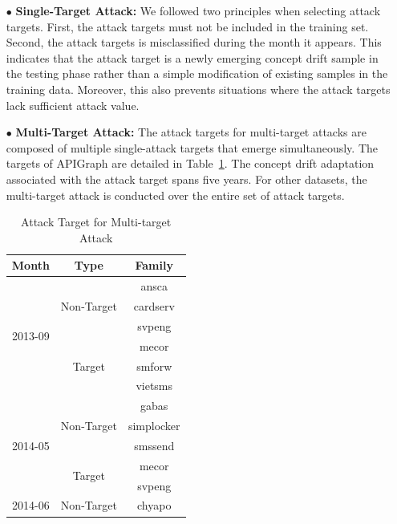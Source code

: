 \documentclass[lettersize,journal]{IEEEtran}
\begin{document}
\begin{itemize}[leftmargin=*]
	
	\item[$\bullet$] \textbf{Single-Target Attack:} 
	We followed two principles when selecting attack targets.
	First, the attack targets must not be included in the training set.
	Second, the attack targets is misclassified during the month it appears.
	This indicates that the attack target is a newly emerging concept drift sample in the testing phase rather than a simple modification of existing samples in the training data.
	Moreover, this also prevents situations where the attack targets lack sufficient attack value.
	
	\item[$\bullet$] \textbf{Multi-Target Attack:} 
	The attack targets for multi-target attacks are composed of multiple single-attack targets that emerge simultaneously.
	The targets of APIGraph are detailed in Table~\ref{tab: Attack Target for Multi-target Attack}.
	The concept drift adaptation associated with the attack target spans five years.
	For other datasets, the multi-target attack is conducted over the entire set of attack targets.
	\begin{table}[ht!]
		\begin{center}
			\caption{Attack Target for Multi-target Attack} %
			\label{tab: Attack Target for Multi-target Attack} %
			\renewcommand{\arraystretch}{0.8}  %
			\begin{tabular}{ccc} %
				\toprule
				\textbf{Month} & \textbf{Type} & \textbf{Family} \\
				\midrule
				\multirow{6}{*}{2013-09} & \multirow{3}{*}{Non-Target} 	& ansca \\ 
				&	& cardserv \\ 
				&	& svpeng  \\ \cline{2-3}
				& \multirow{3}{*}{Target} 	& mecor  \\
				&	& smforw \\
				&	& vietsms \\
				\midrule
				\multirow{5}{*}{2014-05} & \multirow{3}{*}{Non-Target} 	& gabas \\ 
				&	& simplocker \\ 
				&	& smssend \\ \cline{2-3}
				& \multirow{2}{*}{Target} 	& mecor  \\
				&	& svpeng  \\ 
				\midrule
				\multirow{6}{*}{2014-06} & \multirow{4}{*}{Non-Target} 	& chyapo \\ 

\end{tabular}
\end{center}
\end{table}
\end{itemize}
\end{document}
